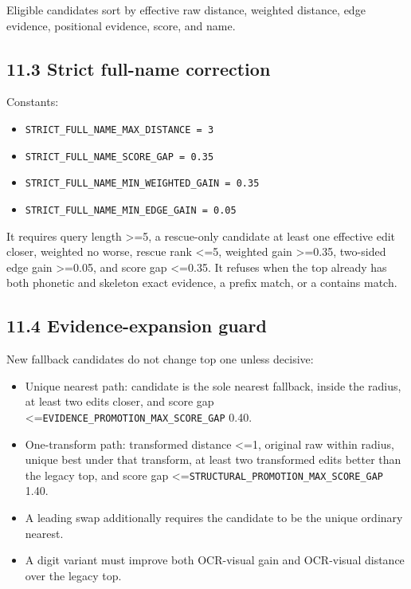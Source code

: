 Eligible candidates sort by effective raw distance, weighted distance, edge evidence, positional evidence, score, and name.

\subsection{11.3 Strict full-name correction}\label{113-strict-full-name-correction}

Constants:

\begin{itemize}
\tightlist
\item
  \texttt{STRICT\_\allowbreak{}FULL\_\allowbreak{}NAME\_\allowbreak{}MAX\_\allowbreak{}DISTANCE\ =\ 3}
\item
  \texttt{STRICT\_\allowbreak{}FULL\_\allowbreak{}NAME\_\allowbreak{}SCORE\_\allowbreak{}GAP\ =\ 0.35}
\item
  \texttt{STRICT\_\allowbreak{}FULL\_\allowbreak{}NAME\_\allowbreak{}MIN\_\allowbreak{}WEIGHTED\_\allowbreak{}GAIN\ =\ 0.35}
\item
  \texttt{STRICT\_\allowbreak{}FULL\_\allowbreak{}NAME\_\allowbreak{}MIN\_\allowbreak{}EDGE\_\allowbreak{}GAIN\ =\ 0.05}
\end{itemize}

It requires query length \textgreater=5, a rescue-only candidate at least one effective edit closer, weighted no worse, rescue rank \textless=5, weighted gain \textgreater=0.35, two-sided edge gain \textgreater=0.05, and score gap \textless=0.35. It refuses when the top already has both phonetic and skeleton exact evidence, a prefix match, or a contains match.

\subsection{11.4 Evidence-expansion guard}\label{114-evidence-expansion-guard}

New fallback candidates do not change top one unless decisive:

\begin{itemize}
\tightlist
\item
  Unique nearest path: candidate is the sole nearest fallback, inside the radius, at least two edits closer, and score gap \textless=\texttt{EVIDENCE\_\allowbreak{}PROMOTION\_\allowbreak{}MAX\_\allowbreak{}SCORE\_\allowbreak{}GAP} 0.40.
\item
  One-transform path: transformed distance \textless=1, original raw within radius, unique best under that transform, at least two transformed edits better than the legacy top, and score gap \textless=\texttt{STRUCTURAL\_\allowbreak{}PROMOTION\_\allowbreak{}MAX\_\allowbreak{}SCORE\_\allowbreak{}GAP} 1.40.
\item
  A leading swap additionally requires the candidate to be the unique ordinary nearest.
\item
  A digit variant must improve both OCR-visual gain and OCR-visual distance over the legacy top.
\end{itemize}

